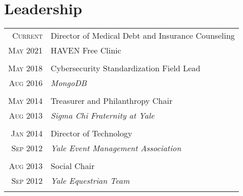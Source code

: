 \documentclass[a4paper,10pt]{article}
\begin{document}
\section{Leadership}
\begin{longtable}{r|p{11cm}}
 \nopagebreak \textsc{Current} & Director of Medical Debt and Insurance Counseling\\
 \nopagebreak \textsc{May 2021} &  \small{HAVEN Free Clinic}\\
 \multicolumn{2}{c}{} \\
 \nopagebreak \textsc{May 2018} & Cybersecurity Standardization Field Lead \\
 \nopagebreak \textsc{Aug 2016} & \small\emph{MongoDB} \\
 \multicolumn{2}{c}{} \\
 \nopagebreak \textsc{May 2014} & Treasurer and Philanthropy Chair \\
 \nopagebreak \textsc{Aug 2013} & \small\emph{Sigma Chi Fraternity at Yale} \\
 \multicolumn{2}{c}{} \\
 \nopagebreak \textsc{Jan 2014} & Director of Technology \\
 \nopagebreak \textsc{Sep 2012} & \small\emph{Yale Event Management Association} \\
 \multicolumn{2}{c}{} \\
 \nopagebreak \textsc{Aug 2013} & Social Chair \\
 \nopagebreak \textsc{Sep 2012} & \small\emph{Yale Equestrian Team} \\
 \multicolumn{2}{c}{} \\
\end{longtable}

\end{document}
